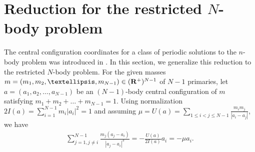 \documentclass[11pt]{article}
\def\R{{\bf R}}
\begin{document}
\setcounter{equation}{0}%
\section{Reduction for the restricted \texorpdfstring{$N$}{N}-body problem}\label{sec:2}
The central configuration coordinates
for a class of periodic solutions to the $n$-body problem was introduced in \cite{MS}. 
In this section, we generalize this reduction to the restricted $N$-body problem.
For the given masses $m=(m_1,m_2,\ldots,m_{N-1})\in (\R^+)^{N-1}$
of $N-1$ primaries, 
let $a=(a_1,a_2,\ldots,a_{N -1})$ be an $(N - 1)$-body central configuration of $m$  satisfying $m_1+m_2+\ldots+m_{N-1}=1$.
Using normalization $2I(a) = \sum_{i = 1}^{N-1}m_i |a_i|^2 = 1$ and assuming  $\mu = U(a) = \sum_{1\le i<j\le N-1}\frac{m_im_j}{|a_i-a_j|}$, we have
\begin{align}
  \sum_{j=1,j\ne i}^{N-1}\frac{m_j(a_{j}-a_{i})}{|a_{j}-a_{i}|^3}
          = -\frac{U(a)}{2I(a)}a_{i}=-\mu a_{i}.    \label{eq.of.cc}
\end{align}
\end{document}
